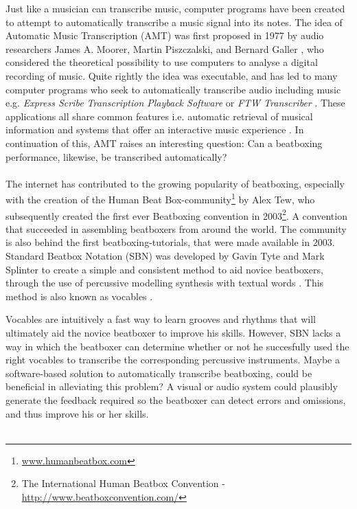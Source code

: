 Just like a musician can transcribe music, computer programs have been created to attempt to automatically transcribe a music signal into its notes. The idea of Automatic Music Transcription (AMT) was first proposed in 1977 by audio researchers James A. Moorer, Martin Piszczalski, and Bernard Galler \citep{Scheirer1998}, who considered the theoretical possibility to use computers to analyse a digital recording of music. Quite rightly the idea was executable, and has led to many computer programs who seek to automatically transcribe audio including music e.g. \textit{ Express Scribe Transcription Playback Software } or \textit{ FTW Transcriber }. These applications all share common features i.e. automatic retrieval of musical information and systems that offer an interactive music experience \citep{Benetos2012}. In continuation of this, AMT raises an interesting question: Can a beatboxing performance, likewise, be transcribed automatically? \\
\\
The internet has contributed to the growing popularity of beatboxing, especially with the creation of the Human Beat Box-community\footnote{\url{www.humanbeatbox.com}} by Alex Tew, who subsequently created the first ever Beatboxing convention in 2003\footnote{The International Human Beatbox Convention - \url{http://www.beatboxconvention.com/}}. A convention that succeeded in assembling beatboxers from around the world. The community is also behind the first beatboxing-tutorials, that were made available in 2003. Standard Beatbox Notation (SBN) was developed by Gavin Tyte and Mark Splinter to create a simple and consistent method to aid novice beatboxers\citep{tyte2005}, through the use of percussive modelling synthesis with textual words \citep{McLean2009}. This method is also known as vocables \citep{McLean2009}.

Vocables are intuitively a fast way to learn grooves and rhythms that will ultimately aid the novice beatboxer to improve his skills. However, SBN lacks a way in which the beatboxer can determine whether or not he succesfully used the right vocables to transcribe the corresponding percussive instruments. Maybe a software-based solution to automatically transcribe beatboxing, could be beneficial in alleviating this problem? A visual or audio system could plausibly  generate  the feedback required so the beatboxer can detect errors and omissions, and thus improve his or her skills.\\
\\

